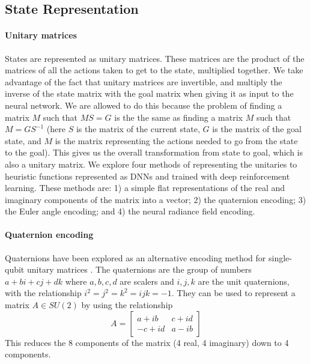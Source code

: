 \documentclass[letterpaper]{article} %
\begin{document}
\subsection{State Representation}


\paragraph{Unitary matrices}
States are represented as unitary matrices.
These matrices are the product of the matrices of all the actions taken to get to the state, multiplied together.
We take advantage of the fact that unitary matrices are invertible, and multiply the inverse of the state matrix
with the goal matrix when giving it as input to the neural network.
We are allowed to do this because the problem of finding a matrix $M$ such that $MS=G$ is the the same as
finding a matrix $M$ such that $M=GS^{-1}$ (here $S$ is the matrix of the current state, $G$ is the matrix of the goal state,
and $M$ is the matrix representing the actions needed to go from the state to the goal).
This gives us the overall transformation from state to goal, which is also a unitary matrix.
We explore four methods of representing the unitaries to heuristic functions represented as DNNs and trained with deep reinforcement learning. These methods are: 1) a simple flat representations of the real and imaginary components of the matrix into a vector; 2) the quaternion encoding; 3) the Euler angle encoding; and 4) the neural radiance field encoding.


\paragraph{Quaternion encoding}


Quaternions have been explored as an alternative encoding method for single-qubit unitary matrices \cite{alam2023quantum}.
The quaternions are the group of numbers $a+bi+cj+dk$ where $a,b,c,d$ are scalers and $i,j,k$ are the
unit quaternions, with the relationship $i^2=j^2=k^2=ijk=-1$.
They can be used to represent a matrix $A \in SU(2)$ by using the relationship
\begin{equation}
	A =
	\begin{bmatrix}
		a+ib & c+id \\
		-c+id & a-ib
	\end{bmatrix}
\end{equation}
This reduces the 8 components of the matrix (4 real, 4 imaginary) down to 4 components.
\end{document}
